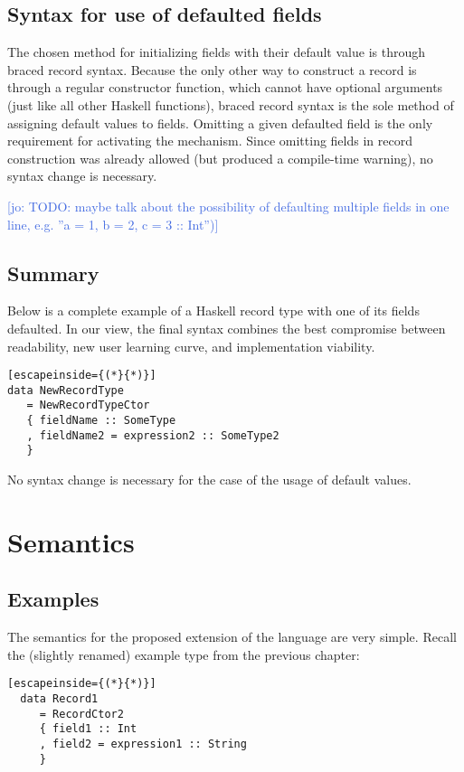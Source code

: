 \documentclass[en]{pracamgr}
\newcommand{\jcom}[1]{\textcolor{RoyalBlue}{[jo: #1]}}
\begin{document}
\section{Syntax for use of defaulted fields}

The chosen method for initializing fields with their default value is through braced record syntax.
Because the only other way to construct a record is through a regular constructor function, which cannot have optional arguments (just like all other Haskell functions), braced record syntax is the sole method of assigning default values to fields.
Omitting a given defaulted field is the only requirement for activating the mechanism. 
Since omitting fields in record construction was already allowed (but produced a compile-time warning), no syntax change is necessary.

\jcom{TODO: maybe talk about the possibility of defaulting multiple fields in one line, e.g. ''a = 1, b = 2, c = 3 :: Int'')}

\section{Summary}
Below is a complete example of a Haskell record type with one of its fields defaulted. 
In our view, the final syntax combines the best compromise between readability, new user learning curve, and implementation viability.

\begin{lstlisting}[escapeinside={(*}{*)}]
data NewRecordType
   = NewRecordTypeCtor 
   { fieldName :: SomeType 
   , fieldName2 = expression2 :: SomeType2
   }
\end{lstlisting}
No syntax change is necessary for the case of the usage of default values.


\chapter{Semantics}
\section{Examples}
The semantics for the proposed extension of the language are very simple.
Recall the (slightly renamed) example type from the previous chapter:

\begin{lstlisting}[escapeinside={(*}{*)}]
  data Record1
     = RecordCtor2 
     { field1 :: Int
     , field2 = expression1 :: String
     }
\end{lstlisting}
  
\end{document}
